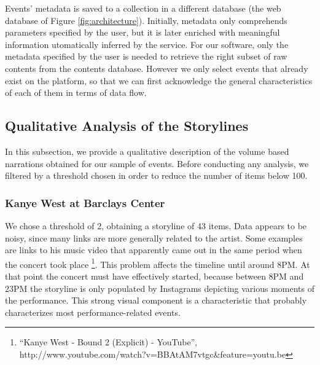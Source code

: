 \documentclass{sig-alternate}
\begin{document}
Events' metadata is saved to a collection in a different database (the web database of Figure \ref{fig:architecture}). Initially, metadata only comprehends parameters specified by the user, but it is later enriched with meaningful information utomatically inferred by the service. For our software, only the metadata specified by the user is needed to retrieve the right subset of raw contents from the contents database. However we only select events that already exist on the platform, so that we can first acknowledge the general characteristics of each of them in terms of data flow.

\subsection{Qualitative Analysis of the Storylines}
\label{sec:storylines}
In this subsection, we provide a qualitative description of the volume based narrations obtained for our sample of events. Before conducting any analysis, we filtered by a threshold chosen in order to reduce the number of items below 100.
\subsubsection{Kanye West at Barclays Center}
We chose a threshold of 2, obtaining a storyline of 43 items. Data appears to be noisy, since many links are more generally related to the artist. Some examples are links to his music video that apparently came out in the same period when the concert took place \footnote{``Kanye West - Bound 2 (Explicit) - YouTube'', http://www.youtube.com/watch?v=BBAtAM7vtgc\&feature=youtu.be}. This problem affects the timeline until around 8PM. At that point the concert must have effectively started, because between 8PM and 23PM the storyline is only populated by Instagrams depicting various moments of the performance. This strong visual component is a characteristic that probably characterizes most performance-related events.
\end{document}
